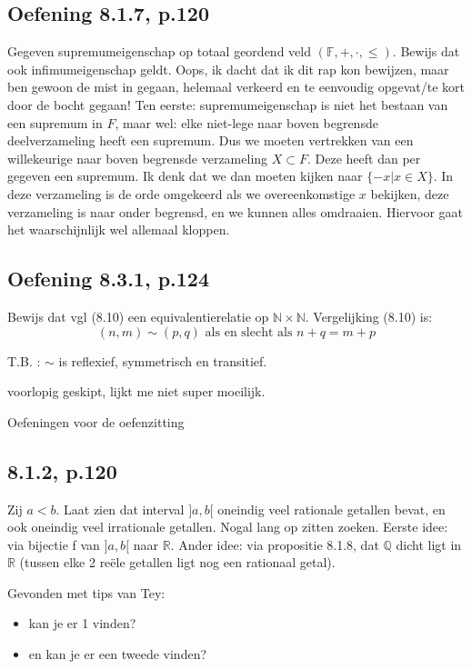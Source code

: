 \documentclass{article}
\begin{document}
\subsection{Oefening 8.1.7, p.120}
Gegeven supremumeigenschap op totaal geordend veld $(\mathbb{F},+,\cdot, \leq)$. Bewijs dat ook infimumeigenschap geldt. 
Oops, ik dacht dat ik dit rap kon bewijzen, maar ben gewoon de mist in gegaan, helemaal verkeerd en te eenvoudig opgevat/te kort door de bocht gegaan! 
Ten eerste: supremumeigenschap is niet het bestaan van een supremum in $F$, maar wel: elke niet-lege naar boven begrensde deelverzameling heeft een supremum. 
Dus we moeten vertrekken van een willekeurige naar boven begrensde verzameling $X \subset F$. Deze heeft dan per gegeven een supremum. 
Ik denk dat we dan moeten kijken naar $\{ -x | x \in X  \}$. In deze verzameling is de orde omgekeerd als we overeenkomstige $x$ bekijken, deze verzameling is naar onder begrensd, en we kunnen alles omdraaien. Hiervoor gaat het waarschijnlijk wel allemaal kloppen. 



\subsection{Oefening 8.3.1, p.124}  
Bewijs dat vgl (8.10) een equivalentierelatie op $\mathbb{N} \times \mathbb{N}$. Vergelijking (8.10) is: \[
(n,m) \sim (p,q) \text{ als en slecht als } n+q=m+p
\]

T.B. : $\sim$ is reflexief, symmetrisch en transitief. 

voorlopig geskipt, lijkt me niet super moeilijk. 



Oefeningen voor de oefenzitting 

\subsection{8.1.2, p.120}
Zij $a<b$. Laat zien dat interval $] a,b[ $ oneindig veel rationale getallen bevat, en ook oneindig veel irrationale getallen. 
Nogal lang op zitten zoeken. Eerste idee: via bijectie f van $] a,b[ $ naar $\mathbb{R}$. Ander idee: via propositie 8.1.8, dat $\mathbb{Q}$ dicht ligt in $\mathbb{R}$ (tussen elke 2 re\"ele getallen ligt nog een rationaal getal). 

Gevonden met tips van Tey: 
\begin{itemize}
    \item kan je er 1 vinden? 
    \item en kan je er een tweede vinden? 
\end{itemize}
\end{document}
